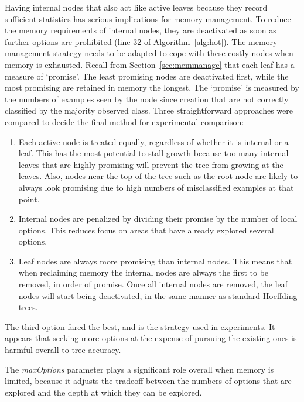 Having internal nodes that also act like active leaves because they record sufficient statistics has serious implications for memory management. To reduce the memory requirements of internal nodes, they are deactivated as soon as further options are prohibited (line 32 of Algorithm~\ref{alg:hot}). The memory management strategy needs to be adapted to cope with these costly nodes when memory is exhausted.
Recall from Section~\ref{sec:memmanage} that each leaf has a measure of `promise'. 
The least promising nodes are deactivated first, while the most promising are retained in memory the longest.
The `promise' is measured by the numbers of examples seen by the node since creation that are not correctly classified by the majority observed class.
Three straightforward approaches were compared to decide the final method for experimental comparison:
\begin{enumerate}
\item Each active node is treated equally, regardless of whether it is internal or a leaf. This has the most potential to stall growth because too many internal leaves that are highly promising will prevent the tree from growing at the leaves. Also, nodes near the top of the tree such as the root node are likely to always look promising due to high numbers of misclassified examples at that point.
\item Internal nodes are penalized by dividing their promise by the number of local options. This reduces focus on areas that have already explored several options.
\item Leaf nodes are always more promising than internal nodes. This means that when reclaiming memory the internal nodes are always the first to be removed, in order of promise. Once all internal nodes are removed, the leaf nodes will start being deactivated, in the same manner as standard Hoeffding trees.
\end{enumerate}
The third option fared the best, and is the strategy used in experiments. It appears that seeking more options at the expense of pursuing the existing ones is harmful overall to tree accuracy.

The {\em maxOptions} parameter plays a significant role overall when memory is limited, because it adjusts the tradeoff between the numbers of options that are explored and the depth at which they can be explored. %


